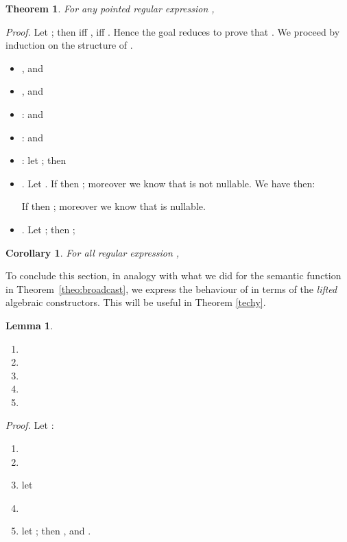\documentclass[preprint]{sigplanconf}
\newcounter{item}
\newtheorem{theorem}[item]{Theorem}
\newtheorem{lemma}[item]{Lemma}
\newtheorem{corollary}[item]{Corollary}
\newenvironment{proof}{\begin{trivlist}\item[]{\em Proof.}}{\end{trivlist}}
\begin{document}
\begin{theorem}
For any pointed regular expression ,

\end{theorem}
\begin{proof}
Let ; then 
iff , iff . Hence the goal reduces to prove
that . 
We proceed by induction on the structure of . 
\begin{itemize}
\item , 
and 

\item , 
and 
\item :  and

\item :  and

\item : let ;
then
 
\item .
Let . If  then
; moreover we
know that  is not nullable. We have then:
 
If  then
; moreover we
know that  is nullable.
 
\item . Let ;
then ;
 
\end{itemize}
\end{proof}
\begin{corollary}\label{R-bullet}
For all regular expression ,

\end{corollary}

\noindent
To conclude this section, in analogy with what we did for the 
semantic function in Theorem~\ref{theo:broadcast}, we express the 
behaviour of  in terms of the {\em lifted} algebraic 
constructors. This will be useful in Theorem \ref{techy}.

\begin{lemma}\ 
\begin{enumerate}
\item 
\item 
\item 
\item 
\item 
\end{enumerate}
\end{lemma}
\begin{proof}
Let : 
\begin{enumerate}
\item 

\item 

\item let 

\item 

\item let ; then
, and . 

\end{enumerate}
\end{proof}
\end{document}
